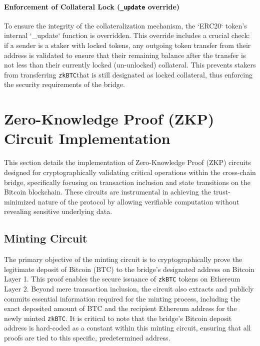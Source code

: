 \documentclass{DESSThesis}
\newcommand{\zktoken}{\texttt{zkBTC}}
\begin{document}
\paragraph{Enforcement of Collateral Lock (\texttt{\_update} override)}
To ensure the integrity of the collateralization mechanism, the `ERC20` token's internal `\_update` function is overridden. This override includes a crucial check: if a sender is a staker with locked tokens, any outgoing token transfer from their address is validated to ensure that their remaining balance after the transfer is not less than their currently locked (un-unlocked) collateral. This prevents stakers from transferring \zktoken that is still designated as locked collateral, thus enforcing the security requirements of the bridge.

\section{Zero-Knowledge Proof (ZKP) Circuit Implementation}
This section details the implementation of Zero-Knowledge Proof (ZKP) circuits designed for cryptographically validating critical operations within the cross-chain bridge, specifically focusing on transaction inclusion and state transitions on the Bitcoin blockchain. These circuits are instrumental in achieving the trust-minimized nature of the protocol by allowing verifiable computation without revealing sensitive underlying data.

\subsection{Minting Circuit}
The primary objective of the minting circuit is to cryptographically prove the legitimate deposit of Bitcoin (BTC) to the bridge's designated address on Bitcoin Layer 1. This proof enables the secure issuance of \texttt{\zktoken} tokens on Ethereum Layer 2. Beyond mere transaction inclusion, the circuit also extracts and publicly commits essential information required for the minting process, including the exact deposited amount of BTC and the recipient Ethereum address for the newly minted \texttt{\zktoken}. It is critical to note that the bridge's Bitcoin deposit address is hard-coded as a constant within this minting circuit, ensuring that all proofs are tied to this specific, predetermined address.
\end{document}
